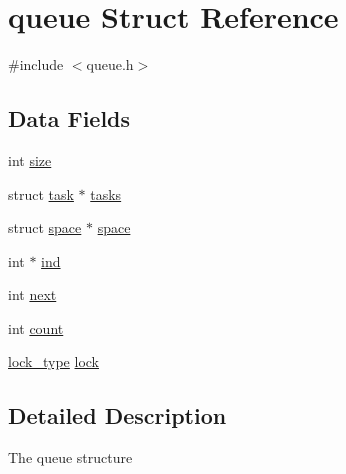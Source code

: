 \hypertarget{structqueue}{\section{queue Struct Reference}
\label{structqueue}
}


{\ttfamily \#include $<$queue.\-h$>$}

\subsection*{Data Fields}
\begin{DoxyCompactItemize}
\item 
int \hyperlink{structqueue_a439227feff9d7f55384e8780cfc2eb82}{size}
\item 
struct \hyperlink{structtask}{task} $\ast$ \hyperlink{structqueue_ace3a87c7e253bce95072d59dfcb2622f}{tasks}
\item 
struct \hyperlink{structspace}{space} $\ast$ \hyperlink{structqueue_a7bfa55c955401f156a7a8cfada4a0ed5}{space}
\item 
int $\ast$ \hyperlink{structqueue_abf6fe97795b10bba2698b51120e35186}{ind}
\item 
int \hyperlink{structqueue_a142a1b51e133e50c0a72b175958ac412}{next}
\item 
int \hyperlink{structqueue_ad43c3812e6d13e0518d9f8b8f463ffcf}{count}
\item 
\hyperlink{lock_8h_aba44f1a15d47fe69256952d82b0058e6}{lock\-\_\-type} \hyperlink{structqueue_ad30fc7af2401a1e1b6b9152df1646ac4}{lock}
\end{DoxyCompactItemize}


\subsection{Detailed Description}
The queue structure 

